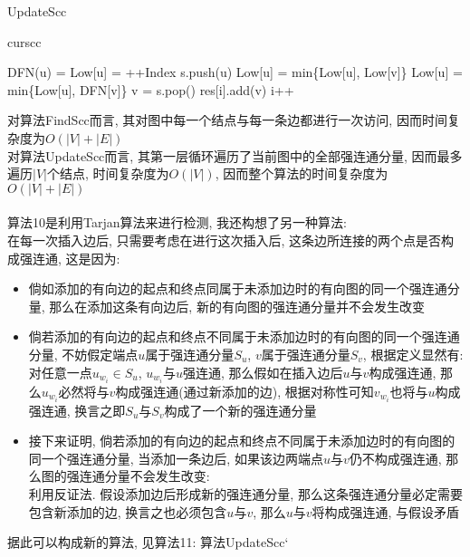 \documentclass{article}
\begin{document}
\begin{algorithm}
\caption{UpdateScc}
\begin{algorithmic}[1]
\State \Return curscc
\EndIf
\EndFor
\State \Return {}
\EndProcedure

\State DFN(u) = Low[u] = ++Index
\State s.push(u)
\State {}
\State Low[u] = min\{Low[u], Low[v]\}
\State Low[u] = min\{Low[u], DFN[v]\}
\EndIf
{}
\State v = s.pop()
\State res[i].add(v)
\State i++
\EndWhile
\EndIf
\EndFor
\EndProcedure
\end{algorithmic}
\end{algorithm}

对算法FindScc而言, 其对图中每一个结点与每一条边都进行一次访问, 因而时间复杂度为$O(|V|+|E|)$ \\
对算法UpdateScc而言, 其第一层循环遍历了当前图中的全部强连通分量, 因而最多遍历$|V|$个结点, 时间复杂度为$O(|V|)$, 因而整个算法的时间复杂度为$O(|V|+|E|)$ \\
\\
算法10是利用Tarjan算法来进行检测, 我还构想了另一种算法: \\
在每一次插入边后, 只需要考虑在进行这次插入后, 这条边所连接的两个点是否构成强连通, 这是因为:
\begin{itemize}
\item 倘如添加的有向边的起点和终点同属于未添加边时的有向图的同一个强连通分量, 那么在添加这条有向边后, 新的有向图的强连通分量并不会发生改变
\item 倘若添加的有向边的起点和终点不同属于未添加边时的有向图的同一个强连通分量, 不妨假定端点$u$属于强连通分量$S_u$, $v$属于强连通分量$S_v$, 根据定义显然有: \\
对任意一点$u_{w_i} \in S_u$, $u_{w_i} $与$u$强连通, 那么假如在插入边后$u$与$v$构成强连通, 那么$u_{w_i} $必然将与$v$构成强连通(通过新添加的边), 根据对称性可知$v_{w_i} $也将与$u$构成强连通, 换言之即$S_u$与$S_v$构成了一个新的强连通分量
\item 接下来证明, 倘若添加的有向边的起点和终点不同属于未添加边时的有向图的同一个强连通分量, 当添加一条边后, 如果该边两端点$u$与$v$仍不构成强连通, 那么图的强连通分量不会发生改变: \\
利用反证法. 假设添加边后形成新的强连通分量, 那么这条强连通分量必定需要包含新添加的边, 换言之也必须包含$u$与$v$, 那么$u$与$v$将构成强连通, 与假设矛盾
\end{itemize}
据此可以构成新的算法, 见算法11: 算法UpdateScc‘
\end{document}
